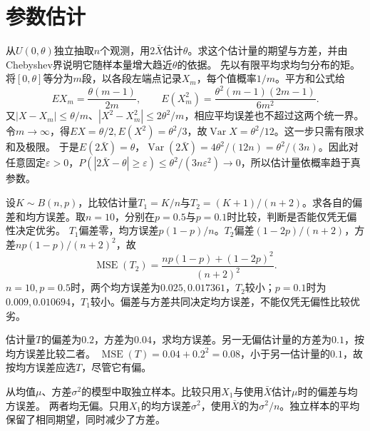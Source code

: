 \par\addvspace{12pt}

\section{参数估计}

从\(U(0,\theta)\)独立抽取\(n\)个观测，用\(2\bar X\)估计\(\theta\)。求这个估计量的期望与方差，并由Chebyshev界说明它随样本量增大趋近\(\theta\)的依据。
\solutionanswer
先以有限平均求均匀分布的矩。将\([0,\theta]\)等分为\(m\)段，以各段左端点记录\(X_m\)，每个值概率\(1/m\)。平方和公式给
\[
 EX_m=\frac{\theta(m-1)}{2m},\qquad E(X_m^2)=\frac{\theta^2(m-1)(2m-1)}{6m^2}.
\]
又\(|X-X_m|\le\theta/m\)、\(|X^2-X_m^2|\le2\theta^2/m\)，相应平均误差也不超过这两个统一界。令\(m\to\infty\)，得\(EX=\theta/2,E(X^2)=\theta^2/3\)，故\(\operatorname{Var}X=\theta^2/12\)。这一步只需有限求和及极限。
于是\(E(2\bar X)=\theta\)，\(\operatorname{Var}(2\bar X)=4\theta^2/(12n)=\theta^2/(3n)\)。因此对任意固定\(\varepsilon>0\)，\(P(|2\bar X-\theta|\ge\varepsilon)\le\theta^2/(3n\varepsilon^2)\to0\)，所以估计量依概率趋于真参数。


设\(K\sim B(n,p)\)，比较估计量\(T_1=K/n\)与\(T_2=(K+1)/(n+2)\)。求各自的偏差和均方误差。取\(n=10\)，分别在\(p=0.5\)与\(p=0.1\)时比较，判断是否能仅凭无偏性决定优劣。
\solutionanswer
\(T_1\)偏差零，均方误差\(p(1-p)/n\)。\(T_2\)偏差\((1-2p)/(n+2)\)，方差\(np(1-p)/(n+2)^2\)，故
\[
 \operatorname{MSE}(T_2)=\frac{np(1-p)+(1-2p)^2}{(n+2)^2}.
\]
\(n=10,p=0.5\)时，两个均方误差为\(0.025,0.017361\)，\(T_2\)较小；\(p=0.1\)时为\(0.009,0.010694\)，\(T_1\)较小。偏差与方差共同决定均方误差，不能仅凭无偏性比较优劣。


估计量\(T\)的偏差为\(0.2\)，方差为\(0.04\)，求均方误差。另一无偏估计量的方差为\(0.1\)，按均方误差比较二者。
\solutionanswer
\(\operatorname{MSE}(T)=0.04+0.2^2=0.08\)，小于另一估计量的\(0.1\)，故按均方误差应选\(T\)，尽管它有偏。


从均值\(\mu\)、方差\(\sigma^2\)的模型中取独立样本。比较只用\(X_1\)与使用\(\bar X\)估计\(\mu\)时的偏差与均方误差。
\solutionanswer
两者均无偏。只用\(X_1\)的均方误差\(\sigma^2\)，使用\(\bar X\)的为\(\sigma^2/n\)。独立样本的平均保留了相同期望，同时减少了方差。


